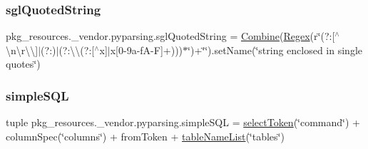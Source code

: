 \subsubsection{\texorpdfstring{sgl\+Quoted\+String}{sglQuotedString}}
{\footnotesize\ttfamily pkg\+\_\+resources.\+\_\+vendor.\+pyparsing.\+sgl\+Quoted\+String = \hyperlink{classpkg__resources_1_1__vendor_1_1pyparsing_1_1_combine}{Combine}(\hyperlink{classpkg__resources_1_1__vendor_1_1pyparsing_1_1_regex}{Regex}(r\char`\"{}\textquotesingle{}(?\+:\mbox{[}$^\wedge$\textquotesingle{}\textbackslash{}n\textbackslash{}r\textbackslash{}\textbackslash{}\mbox{]}$\vert$(?\+:\textquotesingle{}\textquotesingle{})$\vert$(?\+:\textbackslash{}\textbackslash{}(?\+:\mbox{[}$^\wedge$x\mbox{]}$\vert$x\mbox{[}0-\/9a-\/f\+A-\/\+F\mbox{]}+)))$\ast$\char`\"{})+\char`\"{}\textquotesingle{}\char`\"{}).\+set\+Name(\char`\"{}string enclosed in single quotes\char`\"{})}

\mbox{\label{namespacepkg__resources_1_1__vendor_1_1pyparsing_ad42122a5668757fcd1bff017437e5f54}} 
\subsubsection{\texorpdfstring{simple\+S\+QL}{simpleSQL}}
{\footnotesize\ttfamily tuple pkg\+\_\+resources.\+\_\+vendor.\+pyparsing.\+simple\+S\+QL = \hyperlink{namespacepkg__resources_1_1__vendor_1_1pyparsing_a4e4013fea9abcb3931f4bc590568c864}{select\+Token}(\char`\"{}command\char`\"{}) + column\+Spec(\char`\"{}columns\char`\"{}) + from\+Token + \hyperlink{namespacepkg__resources_1_1__vendor_1_1pyparsing_ad65cab86fb975d963a5cb6f4adc24aa9}{table\+Name\+List}(\char`\"{}tables\char`\"{})}

\mbox{\label{namespacepkg__resources_1_1__vendor_1_1pyparsing_a017591b581e824ba494ab366d56a1e6c}} 

